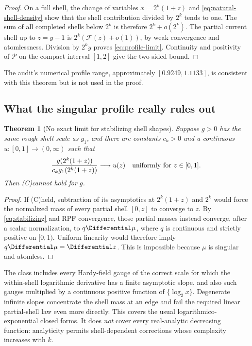 \documentclass[11pt]{article}
\newtheorem{theorem}{Theorem}[section]
\theoremstyle{definition}
\theoremstyle{remark}
\newcommand{\Ceq}{\textup{(C)}}
\begin{document}
\begin{proof}
On a full shell, the change of variables \(x=2^k(1+z)\) and
\eqref{eq:natural-shell-density} show that the shell contribution divided by
\(2^k\) tends to one.  The sum of all completed shells below \(2^k\) is
therefore \(2^k+o(2^k)\).  The partial current shell up to \(z=y-1\) is
\(2^k(\mathscr F(z)+o(1))\), by weak convergence and atomlessness.  Division
by \(2^ky\) proves \eqref{eq:profile-limit}.  Continuity and positivity of
\(\mathscr P\) on the compact interval \([1,2]\) give the two-sided bound.
\end{proof}
The audit's numerical profile range, approximately
\([0.9249,1.1133]\), is consistent with this theorem but is not used in the
proof.

\subsection{What the singular profile really rules out}

\begin{theorem}[No exact limit for stabilizing shell shapes]
\label{thm:no-stabilizing}
Suppose \(g>0\) has the same rough shell scale as \(g_1\), and there are
constants \(c_k>0\) and a continuous \(u:[0,1]\to(0,\infty)\) such that
\begin{equation}
 \frac{g(2^k(1+z))}{c_kg_1(2^k(1+z))}
 \longrightarrow u(z)
 \quad\hbox{uniformly for }z\in[0,1].
 \label{eq:stabilizing}
\end{equation}
Then \Ceq cannot hold for \(g\).
\end{theorem}

\begin{proof}
If \Ceq held, subtraction of its asymptotics at \(2^k(1+z)\) and
\(2^k\) would force the normalized mass of every partial shell \([0,z]\) to
converge to \(z\).  By \eqref{eq:stabilizing} and RPF convergence, those
partial masses instead converge, after a scalar normalization, to
\(q\Differential\mu\), where \(q\) is continuous and strictly positive on \([0,1)\).
Uniform linearity would therefore imply \(q\Differential\mu=\Differential z\).  This is impossible
because \(\mu\) is singular and atomless.
\end{proof}

The class includes every Hardy-field gauge of the correct scale for which the
within-shell logarithmic derivative has a finite asymptotic slope, and also
such gauges multiplied by a continuous positive function of
\(\{\log_2x\}\).  Degenerate infinite slopes concentrate the shell mass at an
edge and fail the required linear partial-shell law even more directly.
This covers the usual logarithmico-exponential closed forms.  It does
\emph{not} cover every real-analytic decreasing function: analyticity permits
shell-dependent corrections whose complexity increases with \(k\).
\end{document}
